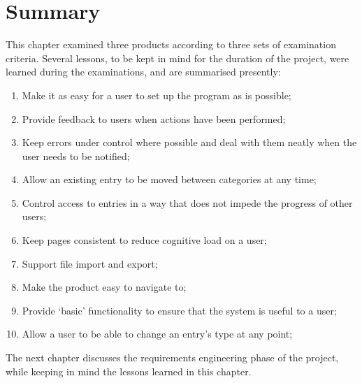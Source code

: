 \section{Summary}
This chapter examined three products according to three sets of examination criteria. Several lessons, to be kept in mind for the duration of the project, were learned during the examinations, and are summarised presently:
\begin{enumerate}
	\item Make it as easy for a user to set up the program as is possible;
	\item Provide feedback to users when actions have been performed;
	\item Keep errors under control where possible and deal with them neatly when the user needs to be notified;
	\item Allow an existing entry to be moved between categories at any time;
	\item Control access to entries in a way that does not impede the progress of other users;
	\item Keep pages consistent to reduce cognitive load on a user;
	\item Support \bibtex{} file import and export;
	\item Make the product easy to navigate to;
	\item Provide `basic' functionality to ensure that the system is useful to a user;
	\item Allow a user to be able to change an entry's type at any point;
\end{enumerate} 

The next chapter discusses the requirements engineering phase of the project, while keeping in mind the lessons learned in this chapter.